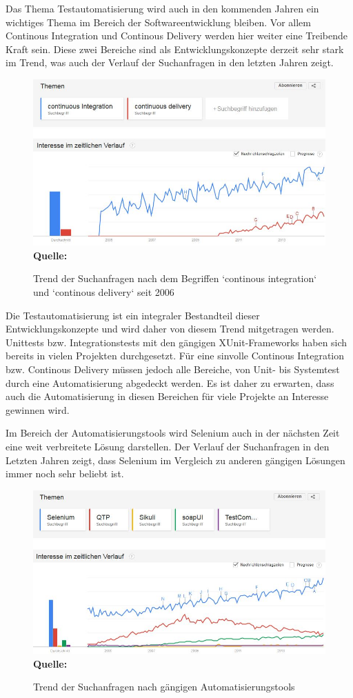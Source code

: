 Das Thema Testautomatisierung wird auch in den kommenden Jahren ein wichtiges Thema im Bereich der Softwareentwicklung bleiben. Vor allem Continous Integration und Continous Delivery werden hier weiter eine Treibende Kraft sein. Diese zwei Bereiche sind als Entwicklungskonzepte derzeit sehr stark im Trend, was auch der Verlauf der Suchanfragen in den letzten Jahren zeigt.
\begin{figure}[htb]
  \centering  
  \includegraphics[scale=0.75]{img/cdTrend.JPG}\\
  \footnotesize\sffamily\textbf{Quelle:} \cite{google_google_2014}
  \caption{Trend der Suchanfragen nach dem Begriffen ‘continous integration‘ und ‘continous delivery‘ seit 2006}
  \label{fig:cdTrend}
\end{figure}
Die Testautomatisierung ist ein integraler Bestandteil dieser Entwicklungskonzepte und wird daher von diesem Trend mitgetragen werden. Unittests bzw. Integrationstests mit den gängigen XUnit-Frameworks haben sich bereits in vielen Projekten durchgesetzt. Für eine sinvolle Continous Integration bzw. Continous Delivery müssen jedoch alle Bereiche, von Unit- bis Systemtest durch eine Automatisierung abgedeckt werden. Es ist daher zu erwarten, dass auch die Automatisierung in diesen Bereichen für viele Projekte an Interesse gewinnen wird.


Im Bereich der Automatisierungstools wird Selenium auch in der nächsten Zeit eine weit verbreitete Lösung darstellen. Der Verlauf der Suchanfragen in den Letzten Jahren zeigt, dass Selenium im Vergleich zu anderen gängigen Lösungen immer noch sehr beliebt ist.

\begin{figure}[htb]
  \centering  
  \includegraphics[scale=0.75]{img/autoToolsTrend.JPG}\\
  \footnotesize\sffamily\textbf{Quelle:} \cite{google_google_2014}
  \caption{Trend der Suchanfragen nach gängigen Automatisierungstools}
  \label{fig:cdTrend}
\end{figure}